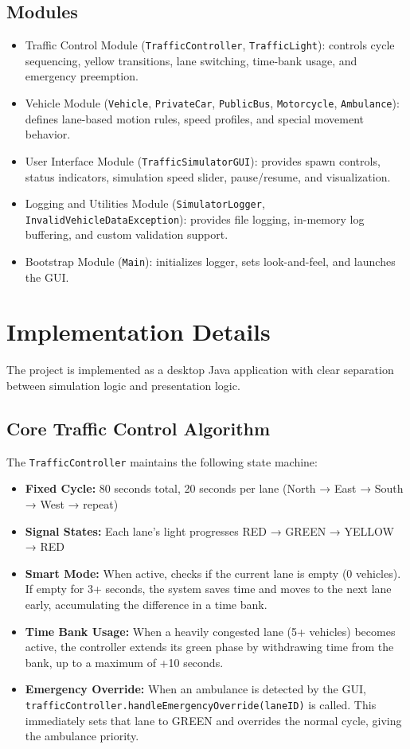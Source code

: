 \documentclass[12pt,a4paper]{article}
\begin{document}
\subsection{Modules}
\begin{itemize}
    \item Traffic Control Module (\texttt{TrafficController}, \texttt{TrafficLight}):
    controls cycle sequencing, yellow transitions, lane switching, time-bank usage, and emergency preemption.
    \item Vehicle Module (\texttt{Vehicle}, \texttt{PrivateCar}, \texttt{PublicBus}, \texttt{Motorcycle}, \texttt{Ambulance}):
    defines lane-based motion rules, speed profiles, and special movement behavior.
    \item User Interface Module (\texttt{TrafficSimulatorGUI}):
    provides spawn controls, status indicators, simulation speed slider, pause/resume, and visualization.
    \item Logging and Utilities Module (\texttt{SimulatorLogger}, \texttt{InvalidVehicleDataException}):
    provides file logging, in-memory log buffering, and custom validation support.
    \item Bootstrap Module (\texttt{Main}):
    initializes logger, sets look-and-feel, and launches the GUI.
\end{itemize}

\section{Implementation Details}
The project is implemented as a desktop Java application with clear separation between simulation logic and presentation logic.

\subsection{Core Traffic Control Algorithm}
The \texttt{TrafficController} maintains the following state machine:
\begin{itemize}
    \item \textbf{Fixed Cycle:} 80 seconds total, 20 seconds per lane (North → East → South → West → repeat)
    \item \textbf{Signal States:} Each lane's light progresses RED → GREEN → YELLOW → RED
    \item \textbf{Smart Mode:} When active, checks if the current lane is empty (0 vehicles). If empty for 3+ seconds, the system saves time and moves to the next lane early, accumulating the difference in a time bank.
    \item \textbf{Time Bank Usage:} When a heavily congested lane (5+ vehicles) becomes active, the controller extends its green phase by withdrawing time from the bank, up to a maximum of +10 seconds.
    \item \textbf{Emergency Override:} When an ambulance is detected by the GUI, \texttt{trafficController.handleEmergencyOverride(laneID)} is called. This immediately sets that lane to GREEN and overrides the normal cycle, giving the ambulance priority.
\end{itemize}
\end{document}
